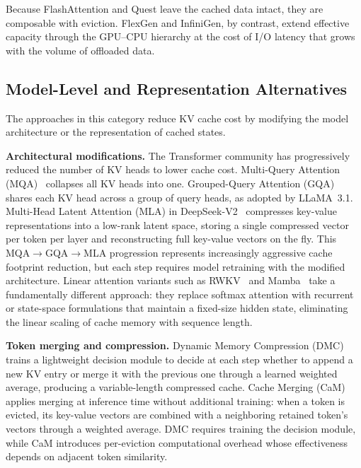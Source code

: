 \documentclass[
english,                 %
bibtex,                  %
]{kththesis}
\numberwithin{listing}{chapter}
\begin{document}
Because FlashAttention and Quest leave the cached data intact, they are composable with eviction. FlexGen and InfiniGen, by contrast, extend effective capacity through the \gls{GPU}--\gls{CPU} hierarchy at the cost of I/O latency that grows with the volume of offloaded data.

\subsection{Model-Level and Representation Alternatives}
\label{sec:bg-model-level}

The approaches in this category reduce \gls{KV} cache cost by modifying the model architecture or the representation of cached states.

\textbf{Architectural modifications.} The Transformer community has progressively reduced the number of \gls{KV} heads to lower cache cost. Multi-Query Attention (MQA)~\cite{shazeer2019fast} collapses all \gls{KV} heads into one. Grouped-Query Attention (GQA)~\cite{ainslie2023gqa} shares each \gls{KV} head across a group of query heads, as adopted by LLaMA~3.1. Multi-Head Latent Attention (MLA) in DeepSeek-V2~\cite{deepseekv2} compresses key-value representations into a low-rank latent space, storing a single compressed vector per token per layer and reconstructing full key-value vectors on the fly. This MQA$\rightarrow$GQA$\rightarrow$MLA progression represents increasingly aggressive cache footprint reduction, but each step requires model retraining with the modified architecture. Linear attention variants such as RWKV~\cite{peng2023rwkv} and Mamba~\cite{gu2024mamba} take a fundamentally different approach: they replace softmax attention with recurrent or state-space formulations that maintain a fixed-size hidden state, eliminating the linear scaling of cache memory with sequence length.

\textbf{Token merging and compression.} Dynamic Memory Compression (DMC)~\cite{nawrot2024dynamic} trains a lightweight decision module to decide at each step whether to append a new \gls{KV} entry or merge it with the previous one through a learned weighted average, producing a variable-length compressed cache. Cache Merging (CaM)~\cite{cam2024} applies merging at inference time without additional training: when a token is evicted, its key-value vectors are combined with a neighboring retained token's vectors through a weighted average. DMC requires training the decision module, while CaM introduces per-eviction computational overhead whose effectiveness depends on adjacent token similarity.
\end{document}
